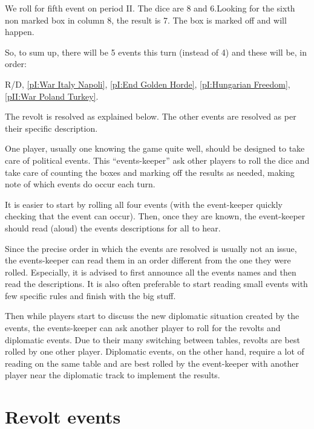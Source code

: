 \begin{exemple}
  We roll for fifth event on period II. The dice are 8 and 6.Looking for
  the sixth non marked box in column 8, the result is 7. The box is
  marked off and  will happen.

  So, to sum up, there will be 5 events this turn (instead of 4) and
  these will be, in order:\par
  R/D, \ref{pI:War Italy Napoli}, \ref{pI:End Golden Horde},
  \ref{pI:Hungarian Freedom}, \ref{pII:War Poland Turkey}.

  The revolt is resolved as explained below. The other events are
  resolved as per their specific description.
\end{exemple}

\begin{playtip}
  One player, usually one knowing the game quite well, should be
  designed to take care of political events. This ``events-keeper'' ask
  other players to roll the dice and take care of counting the boxes and
  marking off the results as needed, making note of which events do
  occur each turn.

  It is easier to start by rolling all four events (with the
  event-keeper quickly checking that the event can occur). Then, once
  they are known, the event-keeper should read (aloud) the events
  descriptions for all to hear.

  Since the precise order in which the events are resolved is usually
  not an issue, the events-keeper can read them in an order different
  from the one they were rolled. Especially, it is advised to first
  announce all the events names and then read the descriptions. It is
  also often preferable to start reading small events with few
  specific rules and finish with the big stuff.

  Then while players start to discuss the new diplomatic situation
  created by the events, the events-keeper can ask another player to
  roll for the revolts and diplomatic events. Due to their many
  switching between tables, revolts are best rolled by one other
  player. Diplomatic events, on the other hand, require a lot of reading
  on the same table and are best rolled by the event-keeper with another
  player near the diplomatic track to implement the results.
\end{playtip}




\section{Revolt events}\label{chEvents:Revolts}

